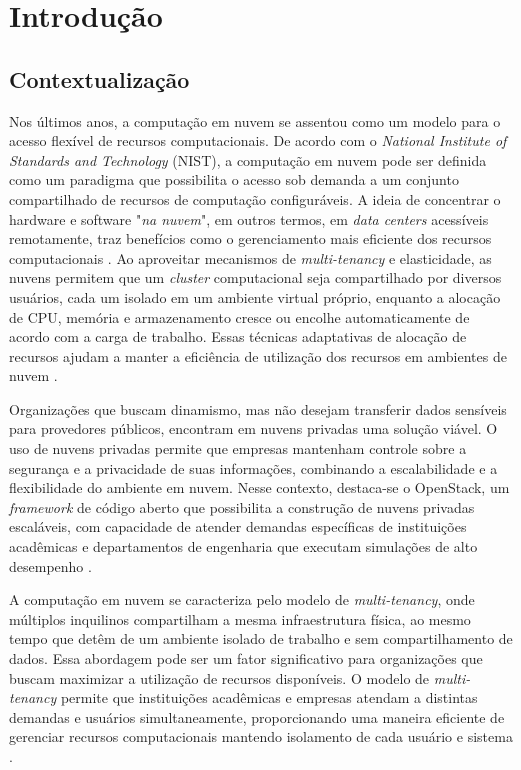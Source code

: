 \chapter{Introdução}


\section{Contextualização}

Nos últimos anos, a computação em nuvem se assentou como um modelo para o acesso flexível de recursos computacionais. De acordo com o \textit{National Institute of Standards and Technology} (NIST), a computação em nuvem pode ser definida como um paradigma que possibilita o acesso sob demanda a um conjunto compartilhado de recursos de computação configuráveis. A ideia de concentrar o hardware e software "\textit{na nuvem}", em outros termos, em \textit{data centers} acessíveis remotamente, traz benefícios como o gerenciamento mais eficiente dos recursos computacionais \cite{mell2011}. Ao aproveitar mecanismos de \textit{multi-tenancy} e elasticidade, as nuvens permitem que um \textit{cluster} computacional seja compartilhado por diversos usuários, cada um isolado em um ambiente virtual próprio, enquanto a alocação de CPU, memória e armazenamento cresce ou encolhe automaticamente de acordo com a carga de trabalho. Essas técnicas adaptativas de alocação de recursos ajudam a manter a eficiência de utilização dos recursos em ambientes de nuvem \cite{dai2015, ray2013}. 

Organizações que buscam dinamismo, mas não desejam transferir dados sensíveis para provedores públicos, encontram em nuvens privadas uma solução viável. O uso de nuvens privadas permite que empresas mantenham controle sobre a segurança e a privacidade de suas informações, combinando a escalabilidade e a flexibilidade do ambiente em nuvem. Nesse contexto, destaca-se o OpenStack, um \textit{framework} de código aberto que possibilita a construção de nuvens privadas escaláveis, com capacidade de atender demandas específicas de instituições acadêmicas e departamentos de engenharia que executam simulações de alto desempenho \cite{heuchert2021}. 

A computação em nuvem se caracteriza pelo modelo de \textit{multi-tenancy}, onde múltiplos inquilinos compartilham a mesma infraestrutura física, ao mesmo tempo que detêm de um ambiente isolado de trabalho e sem compartilhamento de dados. Essa abordagem pode ser um fator significativo para organizações que buscam maximizar a utilização de recursos disponíveis. O modelo de \textit{multi-tenancy} permite que instituições acadêmicas e empresas atendam a distintas demandas e usuários simultaneamente, proporcionando uma maneira eficiente de gerenciar recursos computacionais mantendo isolamento de cada usuário e sistema \cite{heuchert2021}.

